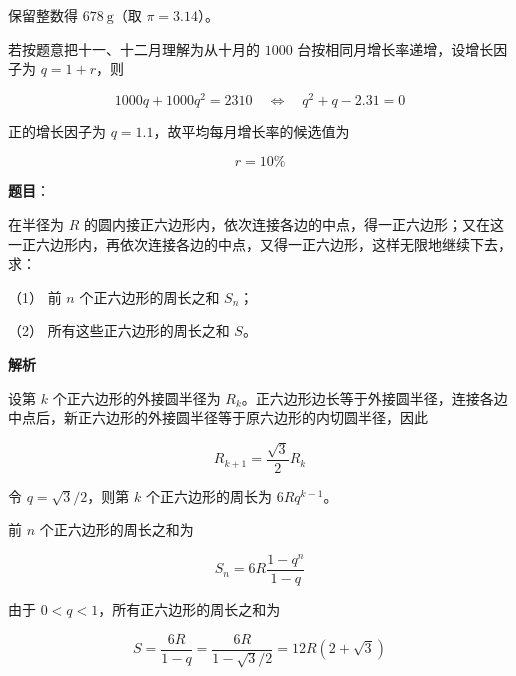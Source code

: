 \begin{answer}
保留整数得 $678\ \mathrm g$（取 $\pi=3.14$）。


若按题意把十一、十二月理解为从十月的 $1000$ 台按相同月增长率递增，设增长因子为 $q=1+r$，则

\nopagebreak[4]
\[
1000q+1000q^2=2310
\quad\Longleftrightarrow\quad
q^2+q-2.31=0
\]

正的增长因子为 $q=1.1$，故平均每月增长率的候选值为

\nopagebreak[4]
\[
r=10\%
\]





\end{answer}
\begin{answer}

\textbf{题目}：

在半径为 $R$ 的圆内接正六边形内，依次连接各边的中点，得一正六边形；又在这一正六边形内，再依次连接各边的中点，又得一正六边形，这样无限地继续下去，求：

（1） 前 $n$ 个正六边形的周长之和 $S_n$；

（2） 所有这些正六边形的周长之和 $S$。

\textbf{解析}

设第 $k$ 个正六边形的外接圆半径为 $R_k$。正六边形边长等于外接圆半径，连接各边中点后，新正六边形的外接圆半径等于原六边形的内切圆半径，因此

\nopagebreak[4]
\[
R_{k+1}=\frac{\sqrt3}{2}R_k
\]

令 $q=\sqrt3/2$，则第 $k$ 个正六边形的周长为 $6Rq^{k-1}$。


前 $n$ 个正六边形的周长之和为

\nopagebreak[4]
\[
S_n=6R\frac{1-q^n}{1-q}
\]


由于 $0<q<1$，所有正六边形的周长之和为

\nopagebreak[4]
\[
S=\frac{6R}{1-q}
=\frac{6R}{1-\sqrt3/2}
=12R(2+\sqrt3)
\]



\end{answer}
